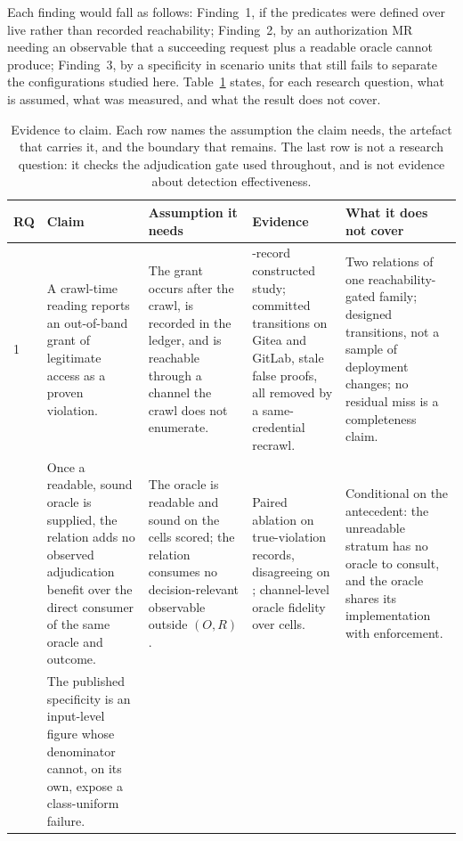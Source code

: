 Each finding would fall as follows: Finding~1, if the predicates were defined over live
rather than recorded reachability; Finding~2, by an authorization MR needing an observable
that a succeeding request plus a readable oracle cannot produce; Finding~3, by a specificity
in scenario units that still fails to separate the configurations studied here.
Table~\ref{tab:evidence-claim} states, for each research question, what is assumed, what was
measured, and what the result does not cover.

\begin{table}[t]
\centering
\caption{Evidence to claim. Each row names the assumption the claim needs, the
artefact that carries it, and the boundary that remains. The last row is not a
research question: it checks the adjudication gate used throughout, and is not
evidence about detection effectiveness.}
\label{tab:evidence-claim}
\footnotesize
\setlength{\tabcolsep}{4pt}
\begin{tabular}{@{}p{}p{}p{}p{}p{}@{}}
\toprule
RQ & Claim & Assumption it needs & Evidence & What it does not cover \\
\midrule
1 &
A crawl-time reading reports an out-of-band grant of legitimate access as a
proven violation. &
The grant occurs after the crawl, is recorded in the ledger, and is reachable
through a channel the crawl does not enumerate. &
\ResSynRecords{}-record constructed study; \TmpBothPolicyEvents{} committed
transitions on Gitea and GitLab, \TmpBothStaleFP{} stale false proofs, all
\TmpBothFixed{} removed by a same-credential recrawl. &
Two relations of one reachability-gated family; designed transitions, not a
sample of deployment changes; no residual miss is a completeness claim. \\
\addlinespace
2 &
Once a readable, sound oracle is supplied, the relation adds no observed
adjudication benefit over the direct consumer of the same oracle and outcome. &
The oracle is readable and sound on the cells scored; the relation consumes no
decision-relevant observable outside $(O,R)$. &
Paired ablation on \ResAbNBola{} true-violation records, disagreeing on
\ResAbDisagreementN{}; channel-level oracle fidelity over
\TmpBothCells{} cells. &
Conditional on the antecedent: the unreadable stratum has no oracle to consult,
and the oracle shares its implementation with enforcement. \\
\addlinespace
3 &
The published specificity is an input-level figure whose denominator cannot, on
its own, expose a class-uniform failure. &

\end{tabular}
\end{table}
